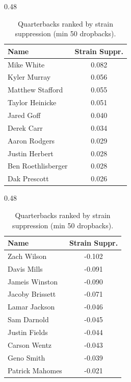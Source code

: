 \begin{table}[h!]
\centering
\begin{subtable}{0.48\textwidth}
\centering
\footnotesize
\begin{tabular}{lc}
\toprule
Name & Strain Suppr. \\
\midrule
Mike White & 0.082 \\
Kyler Murray & 0.056 \\
Matthew Stafford & 0.055 \\
Taylor Heinicke & 0.051 \\
Jared Goff & 0.040 \\
Derek Carr & 0.034 \\
Aaron Rodgers & 0.029 \\
Justin Herbert & 0.028 \\
Ben Roethlisberger & 0.028 \\
Dak Prescott & 0.026 \\
\bottomrule
\end{tabular}
\caption{Most strain-suppressing}
\end{subtable}
\hfill
\begin{subtable}{0.48\textwidth}
\centering
\footnotesize
\begin{tabular}{lc}
\toprule
Name & Strain Suppr. \\
\midrule
Zach Wilson & -0.102 \\
Davis Mills & -0.091 \\
Jameis Winston & -0.090 \\
Jacoby Brissett & -0.071 \\
Lamar Jackson & -0.046 \\
Sam Darnold & -0.045 \\
Justin Fields & -0.044 \\
Carson Wentz & -0.043 \\
Geno Smith & -0.039 \\
Patrick Mahomes & -0.021 \\
\bottomrule
\end{tabular}
\caption{Least strain-suppressing}
\end{subtable}
\hfill
\caption{Quarterbacks ranked by strain suppression (min 50 dropbacks).}
\label{tab:qb_suppression}
\end{table}
